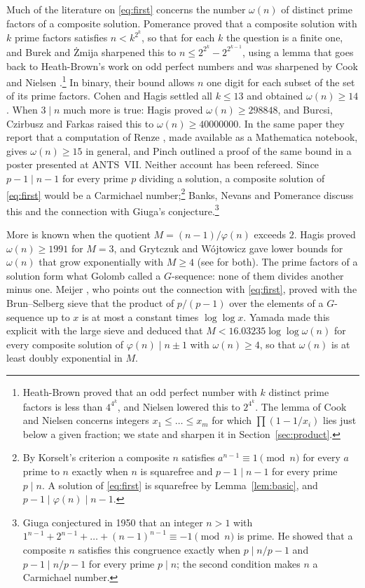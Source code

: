 \documentclass[screen,reqno]{aomart}
\numberwithin{equation}{section}
\theoremstyle{plain}
\theoremstyle{definition}
\theoremstyle{remark}
\begin{document}
Much of the literature on \eqref{eq:first} concerns the number
$\omega(n)$ of distinct prime factors of a composite solution.
Pomerance \cite{Pom77} proved that a composite solution with $k$ prime
factors satisfies $n<k^{2^k}$, so that for each $k$ the question is a
finite one, and Burek and \.Zmija \cite{BZ19} sharpened this to
$n\le2^{2^k}-2^{2^{k-1}}$, using a lemma that goes back to
Heath-Brown's work on odd perfect numbers \cite{HB94} and was
sharpened by Cook \cite{Coo99} and Nielsen \cite{Nie03}.\footnote{Heath-Brown
proved that an odd perfect number with $k$ distinct prime factors is
less than $4^{4^k}$, and Nielsen lowered this to $2^{4^k}$. The lemma
of Cook and Nielsen concerns integers $x_1\le\dots\le x_m$ for which
$\prod(1-1/x_i)$ lies just below a given fraction; we state and
sharpen it in Section~\ref{sec:product}.} In binary,
their bound allows $n$ one digit for each subset of the set of its
prime factors. Cohen and Hagis \cite{CH80} settled all $k\le13$ and
obtained $\omega(n)\ge14$. When $3\mid n$ much more is true: Hagis
\cite{Hag88} proved $\omega(n)\ge298848$, and Burcsi, Czirbusz and
Farkas \cite{BCF11} raised this to $\omega(n)\ge40000000$. In the same
paper they report that a computation of Renze \cite{Ren04}, made
available as a Mathematica notebook, gives $\omega(n)\ge15$ in general,
and Pinch \cite{Pin06} outlined a proof of the same bound in a poster
presented at ANTS~VII. Neither account has been refereed. Since $p-1\mid n-1$ for every prime
$p$ dividing a solution, a composite solution of \eqref{eq:first}
would be a Carmichael number;\footnote{By Korselt's criterion a
composite $n$ satisfies $a^{n-1}\equiv1\pmod n$ for every $a$ prime to
$n$ exactly when $n$ is squarefree and $p-1\mid n-1$ for every prime
$p\mid n$. A solution of \eqref{eq:first} is squarefree by
Lemma~\ref{lem:basic}, and $p-1\mid\varphi(n)\mid n-1$.} Banks, Nevans and Pomerance \cite{BNP09}
discuss this and the connection with Giuga's conjecture.\footnote{Giuga
conjectured in 1950 that an integer $n>1$ with
$1^{n-1}+2^{n-1}+\dots+(n-1)^{n-1}\equiv-1\pmod n$ is prime. He showed
that a composite $n$ satisfies this congruence exactly when
$p\mid n/p-1$ and $p-1\mid n/p-1$ for every prime $p\mid n$; the second
condition makes $n$ a Carmichael number.}

More is known when the quotient $M=(n-1)/\varphi(n)$ exceeds $2$.
Hagis \cite{Hag88} proved $\omega(n)\ge1991$ for $M=3$, and Grytczuk
and W\'ojtowicz \cite{GW03} gave lower bounds for $\omega(n)$ that
grow exponentially with $M\ge4$ (see \cite{Yam23} for both). The prime
factors of a solution form what Golomb \cite{Gol55} called a
$G$-sequence: none of them divides another minus one. Meijer
\cite{Mei74}, who points out the connection with \eqref{eq:first},
proved with the Brun--Selberg sieve that the product of $p/(p-1)$ over
the elements of a $G$-sequence up to $x$ is at most a constant times
$\log\log x$. Yamada \cite{Yam23} made this explicit with the large
sieve and deduced that $M<16.03235\log\log\omega(n)$ for every
composite solution of $\varphi(n)\mid n\pm1$ with $\omega(n)\ge4$, so
that $\omega(n)$ is at least doubly exponential in $M$.
\end{document}

